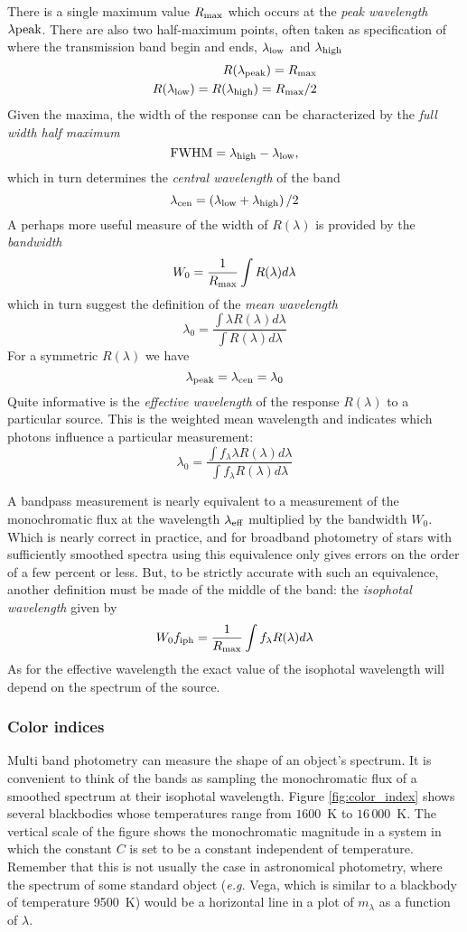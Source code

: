 \documentclass{article}
\newcommand{\bua}{\begin{eqnarray*}}
\newcommand{\eua}{\end{eqnarray*}}
\begin{document}
There is a single maximum value $R_{\rm max}$  which occurs at the
{\it peak wavelength} $\lambda{\rm peak}$. There are also two
half-maximum points, often taken as specification of where the
transmission band begin and ends, $\lambda_{\rm low}$ and
$\lambda_{\rm high}$
\bua
R(\lambda_{\rm peak})=R_{\rm max} \\
R(\lambda_{\rm low})=R(\lambda_{\rm high})={R_{\rm max}/2}
\eua
Given the maxima, the width of the response can be characterized by
the {\it full width half maximum}
\[
{\rm FWHM}=\lambda_{\rm high}-\lambda_{\rm low},
\]
which in turn determines the {\it central wavelength} of the band
\[
\lambda_{\rm cen}={\left(\lambda_{\rm low}+\lambda_{\rm
      high}\right)/2}
\]
A perhaps more useful measure of the width of $R(\lambda)$ is provided
by the {\it bandwidth}
\[
W_0=\frac{1}{R_{\rm max}}\int R(\lambda)d\lambda
\]
which in turn suggest the definition of the {\it mean wavelength}
\[
\lambda_0=\frac{\int\lambda R(\lambda)d\lambda}{\int
  R(\lambda)d\lambda}
\]
For a symmetric $R(\lambda)$ we have
\[
\lambda_{\rm peak}=\lambda_{\rm cen}=\lambda_0
\]
Quite informative is the {\it effective wavelength} of the response
$R(\lambda)$ to a particular source. This is the weighted mean
wavelength and indicates which photons influence a particular
measurement:
\[
\lambda_0=\frac{\int f_\lambda\lambda R(\lambda)d\lambda}{\int
  f_\lambda R(\lambda)d\lambda}
\]

A bandpass measurement is nearly equivalent to a measurement of the
monochromatic flux at the wavelength $\lambda_{\rm eff}$ multiplied by
the bandwidth $W_0$. Which is nearly correct in practice, and for
broadband photometry of stars with sufficiently smoothed spectra using
this equivalence only gives errors on the order of a few percent or
less. But, to be strictly accurate with such an equivalence, another
definition must be made of the middle of the band: the {\it isophotal
  wavelength} given by
\[
W_0f_{\rm iph}=\frac{1}{R_{\rm max}}\int f_\lambda R(\lambda)d\lambda
\]
As for the effective wavelength the exact value of the isophotal
wavelength will depend on the spectrum of the source. 

\subsubsection{Color indices}

Multi band photometry can measure the shape of an object's
spectrum. It is convenient to think of the bands as sampling the
monochromatic flux of a smoothed spectrum at their isophotal
wavelength. Figure \ref{fig:color_index} shows several blackbodies
whose temperatures range from $1600$~K to $16\,000$~K. The vertical
scale of the figure shows the monochromatic magnitude in a system in
which the constant $C$ is set to be a constant independent of
temperature. Remember that this is not usually the case in
astronomical photometry, where the spectrum of some standard object
({\it e.g.} Vega, which is similar to a blackbody of temperature
9500~K) would be a horizontal line in a plot of $m_\lambda$ as a
function of $\lambda$. 
\end{document}
